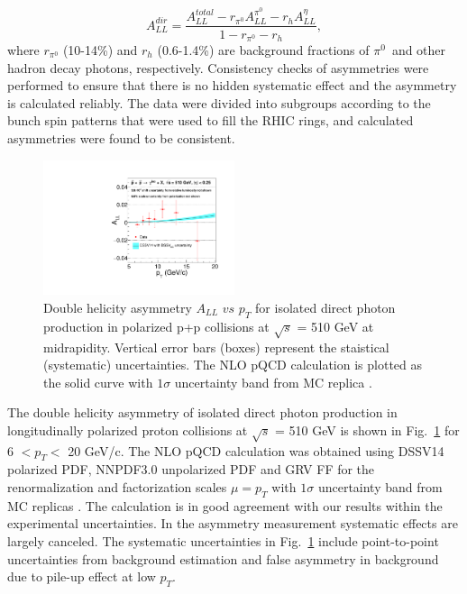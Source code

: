 \documentclass[twocolumn,letterpaper,aps,prl,longbibliography,superscriptaddress,floatfix]{revtex4-2}
\newcommand{\pT}{\ensuremath{p_T}}
\newcommand{\pizero}{\ensuremath{\pi^0}}
\begin{document}
\begin{equation} \label{eq:all-dir}
A_{LL}^{dir} = \frac{A_{LL}^{total} - r_{\pi^0}A_{LL}^{\pi^0} -r_h A_{LL}^{\eta}}{1 - r_{\pi^0} - r_h},
\end{equation}
where $r_{\pi^0}$ (10-14\%) and $r_h$ (0.6-1.4\%) are background fractions of \pizero\ and other hadron decay photons, respectively. Consistency checks of asymmetries were performed to ensure that there is no hidden systematic effect and the asymmetry is calculated reliably. The data were divided into subgroups according to the bunch spin patterns that were used to fill the RHIC rings, and calculated asymmetries were found to be consistent.

\begin{figure}[htb]
\centering
\includegraphics[width=0.5\textwidth]{IsoPhotonALL-beam2}
\caption{Double helicity asymmetry $A_{LL}$ $vs$ $p_{T}$ for isolated direct photon production in polarized p+p collisions at $\sqrt{s}$ = 510 GeV at midrapidity. Vertical error bars (boxes) represent the staistical (systematic) uncertainties. The NLO pQCD calculation is plotted as the solid curve with $1\sigma$ uncertainty band from MC replica \cite{PhysRevLett.101.072001,PhysRevLett.113.012001,PhysRevD.100.114027}.}
\label{fig:all}
\end{figure}

The double helicity asymmetry of isolated direct photon production in longitudinally polarized proton collisions at $\sqrt{s}$ = 510 GeV is shown in Fig.~\ref{fig:all} for 6 $< p_{T} <$ 20 GeV/c. The NLO pQCD calculation was obtained using DSSV14 polarized PDF, NNPDF3.0 unpolarized PDF and GRV FF for the renormalization and factorization scales $\mu = p_T$ with $1\sigma$ uncertainty band from MC replicas \cite{PhysRevLett.101.072001,PhysRevLett.113.012001,PhysRevD.100.114027}. The calculation is in good agreement with our results within the experimental uncertainties. In the asymmetry measurement systematic effects are largely canceled. The systematic uncertainties in Fig.~\ref{fig:all} include point-to-point uncertainties from background estimation and false asymmetry in background due to pile-up effect at low \pT.
\end{document}
